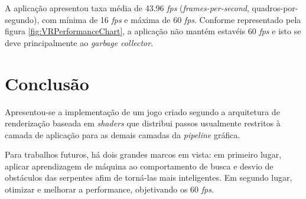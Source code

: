 \documentclass[conference]{IEEEtran}
\begin{document}
A aplicação apresentou taxa média de 43.96 \textit{fps} (\textit{frames-per-second}, quadros-por-segundo), com mínima de 16 \textit{fps} e máxima de 60 \textit{fps}. Conforme representado pela figura \ref{fig:VRPerformanceChart}, a aplicação não mantém estavéis 60 \textit{fps} e isto se deve principalmente ao \textit{garbage collector}.

\section{Conclusão}\label{sec:conclusion}
Apresentou-se a implementação de um jogo criado segundo a arquitetura de renderização baseada em \textit{shaders} que distribui passos usualmente restritos à camada de aplicação para as demais camadas da \textit{pipeline} gráfica.

Para trabalhos futuros, há dois grandes marcos em vista: em primeiro lugar, aplicar aprendizagem de máquina ao comportamento de busca e desvio de obstáculos das serpentes afim de torná-las mais inteligentes. Em segundo lugar, otimizar e melhorar a performance, objetivando os 60 \textit{fps}. 



% 





\end{document}
